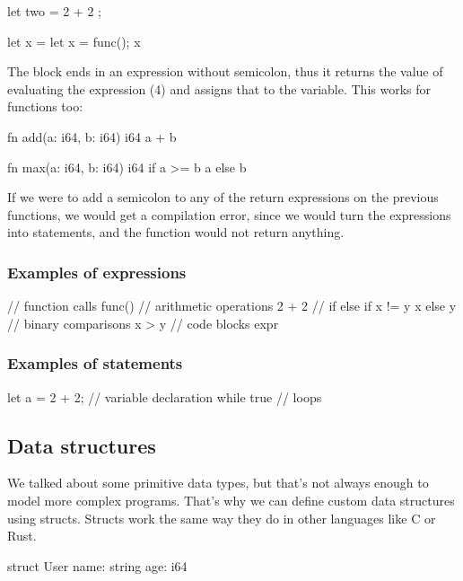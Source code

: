 ﻿\documentclass[10pt,a4paper,twocolumn,twoside]{article}
\begin{document}
\begin{code}
    let two = {
        2 + 2
    };

    let x = {
        let x = func();
        x
    }
\end{code}

The block ends in an expression without semicolon, thus it returns the value of
evaluating the expression (4) and assigns that to the variable. This works for 
functions too:

\begin{code}
    fn add(a: i64, b: i64) i64 {
        a + b
    }

    fn max(a: i64, b: i64) i64 {
        if a >= b { a } else { b }
    }
\end{code}

If we were to add a semicolon to any of the return expressions on the previous
functions, we would get a compilation error, since we would turn the expressions
into statements, and the function would not return anything.

\subsubsection{Examples of expressions}
\begin{code}
// function calls
func()
// arithmetic operations
2 + 2 
// if else
if x != y { x } else { y }
// binary comparisons
x > y 
// code blocks
{ expr }
\end{code}

\subsubsection{Examples of statements}
\begin{code}
let a = 2 + 2; // variable declaration
while true {  } // loops
\end{code}

\subsection{Data structures}
We talked about some primitive data types, but that's not always enough to model
more complex programs. That's why we can define custom data structures using 
structs. Structs work the same way they do in other languages like C or Rust.

\begin{code}
struct User {
    name: string
    age: i64
}
\end{code}
\end{document}
